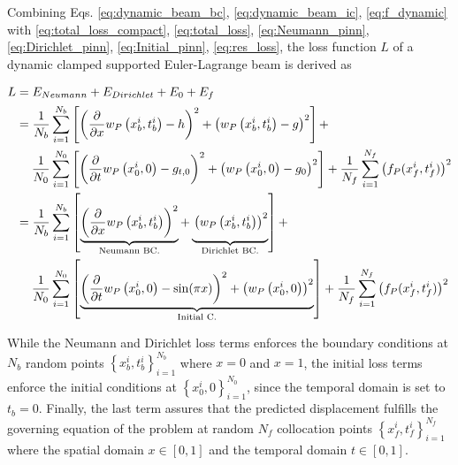Combining Eqs. \ref{eq:dynamic_beam_bc}, \ref{eq:dynamic_beam_ic}, \ref{eq:f_dynamic} with \ref{eq:total_loss_compact}, 
\ref{eq:total_loss}, \ref{eq:Neumann_pinn}, \ref{eq:Dirichlet_pinn}, \ref{eq:Initial_pinn}, \ref{eq:res_loss}, the loss
function $L$ of a dynamic clamped supported Euler-Lagrange beam is derived as

\begin{equation}
    \label{eq:app_dynamic_overall_loss}
    \begin{aligned} 
        L & = E_{Neumann} + E_{Dirichlet} + E_{0} + E_{f} \\ 
          & = \frac{1}{N_{b}} \sum_{i=1}^{N_{b}}\left[\left(\frac{\partial}{\partial x} w_{P}\left(x_{b}^{i},t_{b}^{i}\right)-h\right)^{2} +
          \left( w_{P}\left(x_{b}^{i},t_{b}^{i}\right)-g\right)^{2} \right] + \\
          & \quad \; \frac{1}{N_{0}} \sum_{i=1}^{N_{0}}\left[\left(\frac{\partial}{\partial t} w_{P}\left(x_{0}^{i},0\right)-g_{t,0}\right)^{2} +
          \left( w_{P}\left(x_{0}^{i},0\right)-g_{0}\right)^{2} \right] + 
          \frac{1}{N_{f}} \sum_{i=1}^{N_{f}}\left(f_{P} (x_{f}^{i},t_{f}^{i})\right)^{2} \\
          & = \frac{1}{N_{b}} \sum_{i=1}^{N_{b}}\left[\underbrace{\left(\frac{\partial}{\partial x} w_{P}\left(x_{b}^{i},t_{b}^{i}\right)\right)^{2}}_{\text{Neumann BC.}} +
          \underbrace{ \vphantom{\left(\frac{\partial}{\partial x}\right)} \left( w_{P}\left(x_{b}^{i},t_{b}^{i}\right)\right)^{2}}_{\text{Dirichlet BC.}} \right] + \\
          & \quad \; \frac{1}{N_{0}} \sum_{i=1}^{N_{0}}\left[\underbrace{ \left(\frac{\partial}{\partial t} w_{P}\left(x_{0}^{i},0\right)-\sin (\pi x)\right)^{2} +
          \left( w_{P}\left(x_{0}^{i},0\right)\right)^{2}}_{\text{Initial C.}} \right] +  
          \frac{1}{N_{f}} \sum_{i=1}^{N_{f}}\left(f_{P} (x_{f}^{i},t_{f}^{i})\right)^{2}
    \end{aligned}
\end{equation}

While the Neumann and Dirichlet loss terms enforces the boundary conditions at $N_{b}$ random points 
$\left\{x_{b}^{i},t_{b}^{i}\right\}_{i=1}^{N_{b}}$ where $x=0$ and $x=1$, the initial loss terms enforce the initial conditions at 
$\left\{x_{0}^{i},0\right\}_{i=1}^{N_{0}}$, since the temporal domain is set to $t_{b}=0$. Finally, the last term assures 
that the predicted displacement fulfills the governing equation of the problem at random $N_{f}$ collocation points
$\left\{x_{f}^{i},t_{f}^{i}\right\}_{i=1}^{N_{f}}$ where the spatial domain $x \in [0,1]$ and the temporal domain $t \in [0,1]$. 


